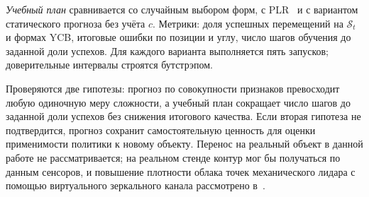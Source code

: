 \documentclass{misisarticle}
\begin{document}
\textit{Учебный план} сравнивается со случайным выбором форм, с PLR~\cite{jiang2021} и с вариантом статического прогноза без учёта $c$. Метрики: доля успешных перемещений на $\mathcal{S}_t$ и формах YCB, итоговые ошибки по позиции и углу, число шагов обучения до заданной доли успехов. Для каждого варианта выполняется пять запусков; доверительные интервалы строятся бутстрэпом.

Проверяются две гипотезы: прогноз по совокупности признаков превосходит любую одиночную меру сложности, а учебный план сокращает число шагов до заданной доли успехов без снижения итогового качества. Если вторая гипотеза не подтвердится, прогноз сохранит самостоятельную ценность для оценки применимости политики к новому объекту. Перенос на реальный объект в данной работе не рассматривается; на реальном стенде контур мог бы получаться по данным сенсоров, и повышение плотности облака точек механического лидара с помощью виртуального зеркального канала рассмотрено в~\cite{vishnevsky2026}.
\end{document}
